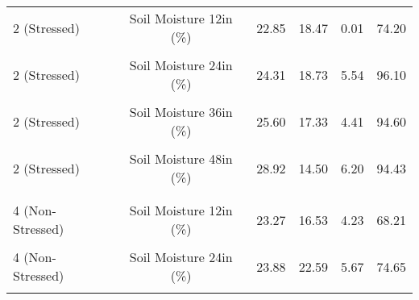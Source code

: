 \begin{table}[!h]
{\begin{tabular}[t]{lcrrrr}
\hspace{1em}2 (Stressed) & Soil Moisture 12in (\%) & 22.85 & 18.47 & 0.01 & 74.20\\
\hspace{1em}\cellcolor{gray!10}{2 (Stressed)} & \cellcolor{gray!10}{Soil Moisture 18in (\%)} & \cellcolor{gray!10}{25.47} & \cellcolor{gray!10}{17.01} & \cellcolor{gray!10}{4.31} & \cellcolor{gray!10}{95.58}\\
\hspace{1em}2 (Stressed) & Soil Moisture 24in (\%) & 24.31 & 18.73 & 5.54 & 96.10\\
\hspace{1em}\cellcolor{gray!10}{2 (Stressed)} & \cellcolor{gray!10}{Soil Moisture 30in (\%)} & \cellcolor{gray!10}{26.17} & \cellcolor{gray!10}{20.78} & \cellcolor{gray!10}{4.73} & \cellcolor{gray!10}{97.47}\\
\hspace{1em}2 (Stressed) & Soil Moisture 36in (\%) & 25.60 & 17.33 & 4.41 & 94.60\\
\hspace{1em}\cellcolor{gray!10}{2 (Stressed)} & \cellcolor{gray!10}{Soil Moisture 42in (\%)} & \cellcolor{gray!10}{30.33} & \cellcolor{gray!10}{19.57} & \cellcolor{gray!10}{2.24} & \cellcolor{gray!10}{88.81}\\
\hspace{1em}2 (Stressed) & Soil Moisture 48in (\%) & 28.92 & 14.50 & 6.20 & 94.43\\
\addlinespace[0.3em]
\multicolumn{6}{l}{\textbf{4 (Non-Stressed)}}\\
\hspace{1em}\cellcolor{gray!10}{4 (Non-Stressed)} & \cellcolor{gray!10}{Soil Moisture 6in (\%)} & \cellcolor{gray!10}{22.52} & \cellcolor{gray!10}{18.18} & \cellcolor{gray!10}{4.98} & \cellcolor{gray!10}{75.12}\\
\hspace{1em}4 (Non-Stressed) & Soil Moisture 12in (\%) & 23.27 & 16.53 & 4.23 & 68.21\\
\hspace{1em}\cellcolor{gray!10}{4 (Non-Stressed)} & \cellcolor{gray!10}{Soil Moisture 18in (\%)} & \cellcolor{gray!10}{25.89} & \cellcolor{gray!10}{23.99} & \cellcolor{gray!10}{8.01} & \cellcolor{gray!10}{77.12}\\
\hspace{1em}4 (Non-Stressed) & Soil Moisture 24in (\%) & 23.88 & 22.59 & 5.67 & 74.65\\
\hspace{1em}\cellcolor{gray!10}{4 (Non-Stressed)} & \cellcolor{gray!10}{Soil Moisture 30in (\%)} & \cellcolor{gray!10}{22.87} & \cellcolor{gray!10}{20.20} & \cellcolor{gray!10}{5.04} & \cellcolor{gray!10}{66.38}\\

\end{tabular}}
\end{table}
